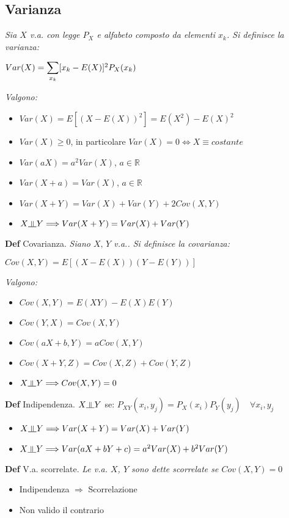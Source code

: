 \documentclass[10pt,a4paper]{article}
\newcommand{\indep}{\rotatebox[origin=c]{90}{$\models$}}
\begin{document}
\begin{multicols}{2}
\subsection*{Varianza}
\textit{Sia $X$ v.a. con legge $P_X$ e alfabeto composto da elementi $x_k$. Si definisce la varianza:}

$Var(X) = \mathlarger{\sum_{x_k}}[x_k - E(X)]^2 P_X(x_k)$

\textit{Valgono:}
\begin{itemize}
\item $Var(X) = E[(X-E(X))^2] = E(X^2) - E(X)^2$
\item $Var(X) \geq 0$, in particolare $Var(X) = 0 \Leftrightarrow X \equiv costante$
\item $Var(aX) = a^2 Var(X)$, $a \in \mathbb{R}$
\item $Var(X + a) = Var(X)$, $a \in \mathbb{R}$
\item $Var(X+Y)=Var(X)+Var(Y)+2Cov(X,Y)$
\item $X \indep Y \Longrightarrow Var(X+Y) = Var(X) + Var(Y)$
\end{itemize}
\textbf{Def} Covarianza. \textit{Siano $X,\,Y$ v.a.. Si definisce la covarianza:}

$Cov(X, Y) = E[(X - E(X))(Y - E(Y))]$

\textit{Valgono:}
\begin{itemize}
\item $Cov(X, Y) = E(XY) - E(X)E(Y)$
\item $Cov(Y, X) = Cov(X, Y)$
\item $Cov(aX + b, Y) = aCov(X, Y)$
\item $Cov(X + Y, Z) = Cov(X, Z) + Cov(Y, Z)$
\item $X \indep Y \Longrightarrow Cov(X, Y) = 0$
\end{itemize}
\textbf{Def} Indipendenza. $X \indep Y$ se:
$P_{XY}(x_i, y_j) = P_X(x_i)P_Y(y_j) \quad\forall x_i, y_j$
\begin{itemize}
\item $X \indep Y \Longrightarrow Var(X+Y) = Var(X) + Var(Y)$
\item $X \indep Y \Longrightarrow Var(aX+bY+c) = a^2 Var(X) + b^2 Var(Y)$
\end{itemize}
\textbf{Def} V.a. scorrelate. \textit{Le v.a. $X$, $Y$ sono dette scorrelate se $Cov(X, Y) = 0$}\\
\begin{itemize}
    \item Indipendenza $\Longrightarrow$ Scorrelazione
    \item Non valido il contrario
\end{itemize}



\end{multicols}
\end{document}
